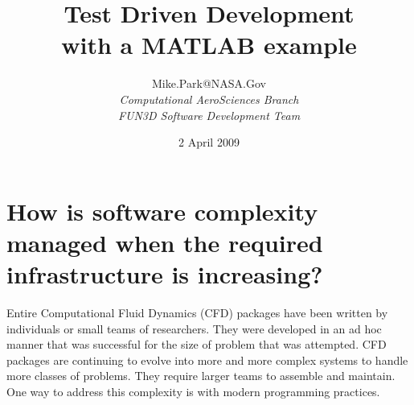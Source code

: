 \documentclass[twocolumn]{article}
\title{{\bfseries\Large Test Driven Development}\\ with a MATLAB example}
\author{
Mike.Park@NASA.Gov\\
	 {\itshape Computational AeroSciences Branch} \\
	 {\itshape FUN3D Software Development Team}
}
\date{2 April 2009}
\begin{document}
  
  \maketitle

  \section{How is software complexity managed when the required 
    infrastructure is increasing?}  Entire Computational Fluid
  Dynamics (CFD) packages have been written by individuals or small
  teams of researchers. They were developed in an ad hoc manner that
  was successful for the size of problem that was attempted. CFD
  packages are continuing to evolve into more and more complex systems
  to handle more classes of problems. They require larger teams to
  assemble and maintain. One way to address this complexity is with
  modern programming practices.
\end{document}
